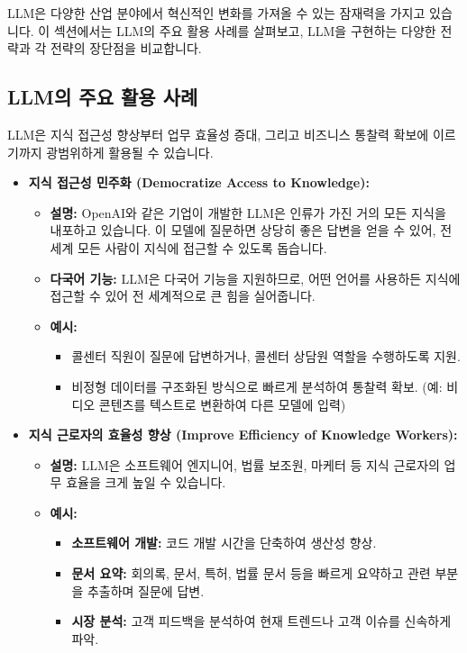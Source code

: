 \documentclass[11pt,a4paper]{article}
\begin{document}
LLM은 다양한 산업 분야에서 혁신적인 변화를 가져올 수 있는 잠재력을 가지고 있습니다. 이 섹션에서는 LLM의 주요 활용 사례를 살펴보고, LLM을 구현하는 다양한 전략과 각 전략의 장단점을 비교합니다.

\subsection{LLM의 주요 활용 사례}

LLM은 지식 접근성 향상부터 업무 효율성 증대, 그리고 비즈니스 통찰력 확보에 이르기까지 광범위하게 활용될 수 있습니다.

\begin{itemize}
    \item \textbf{지식 접근성 민주화 (Democratize Access to Knowledge):}
    \begin{itemize}
        \item \textbf{설명:} OpenAI와 같은 기업이 개발한 LLM은 인류가 가진 거의 모든 지식을 내포하고 있습니다. 이 모델에 질문하면 상당히 좋은 답변을 얻을 수 있어, 전 세계 모든 사람이 지식에 접근할 수 있도록 돕습니다.
        \item \textbf{다국어 기능:} LLM은 다국어 기능을 지원하므로, 어떤 언어를 사용하든 지식에 접근할 수 있어 전 세계적으로 큰 힘을 실어줍니다.
        \item \textbf{예시:}
        \begin{itemize}
            \item 콜센터 직원이 질문에 답변하거나, 콜센터 상담원 역할을 수행하도록 지원.
            \item 비정형 데이터를 구조화된 방식으로 빠르게 분석하여 통찰력 확보. (예: 비디오 콘텐츠를 텍스트로 변환하여 다른 모델에 입력)
        \end{itemize}
    \end{itemize}

    \item \textbf{지식 근로자의 효율성 향상 (Improve Efficiency of Knowledge Workers):}
    \begin{itemize}
        \item \textbf{설명:} LLM은 소프트웨어 엔지니어, 법률 보조원, 마케터 등 지식 근로자의 업무 효율을 크게 높일 수 있습니다.
        \item \textbf{예시:}
        \begin{itemize}
            \item \textbf{소프트웨어 개발:} 코드 개발 시간을 단축하여 생산성 향상.
            \item \textbf{문서 요약:} 회의록, 문서, 특허, 법률 문서 등을 빠르게 요약하고 관련 부분을 추출하며 질문에 답변.
            \item \textbf{시장 분석:} 고객 피드백을 분석하여 현재 트렌드나 고객 이슈를 신속하게 파악.
        \end{itemize}
    \end{itemize}


\end{itemize}
\end{document}
